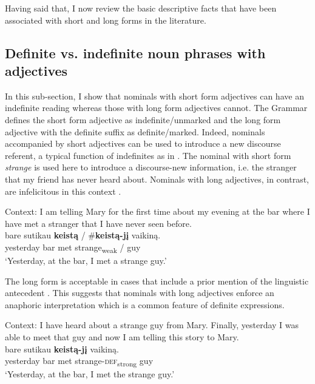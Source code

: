 \documentclass[output=paper,
modfonts
]{langscibook}
\begin{document}
Having said that, I now review the basic descriptive facts that have been associated with short and long forms in the literature. 


\subsection{Definite vs. indefinite noun phrases with adjectives} \label{sec:sereikaite:4.1}\largerpage[-2]

In this sub-section, I show that nominals with short form adjectives can have an indefinite reading whereas those with long form adjectives cannot. The  Grammar \citep{Ambrazas1997} defines the short form adjective as indefinite/unmarked and the long form adjective with the definite suffix as definite/marked. Indeed, nominals accompanied by short adjectives can be used to introduce a new discourse referent, a typical function of indefinites as in . The nominal with short form \textit{strange} is used here to introduce a discourse-new information, i.e. the stranger that my friend has never heard about. Nominals with long adjectives, in contrast, are infelicitous in this context .

\begin{exe}
\ex \label{ex:sereikaite:32}
Context: I am telling Mary for the first 
time about my evening at the bar where I have met a stranger that I have never seen before. \\
 {bare} {sutikau} \textbf{keistą} \textnormal{/} \textnormal{\#}\textbf{keistą-jį} {vaikiną}. \\
yesterday bar met {strange\textsubscript{weak}} /  guy\\
\trans `Yesterday, at the bar, I met a strange guy.' \\
\end{exe}

The long form is acceptable in cases that include a prior mention of the linguistic antecedent . This suggests that nominals with long adjectives enforce an anaphoric interpretation which is a common feature of definite expressions. 
 
\begin{exe}
\ex \label{ex:sereikaite:33}
Context: I have heard about a strange guy from Mary. Finally, yesterday I was able to meet that guy and now I am telling this story to Mary.\\
 {bare} {sutikau} {\textbf{keistą-jį}} {vaikiną}. \\
yesterday bar met {strange-\textsc{def}\textsubscript{strong}} guy\\
\trans `Yesterday, at the bar, I met the strange guy.' \\
\end{exe}
\end{document}
